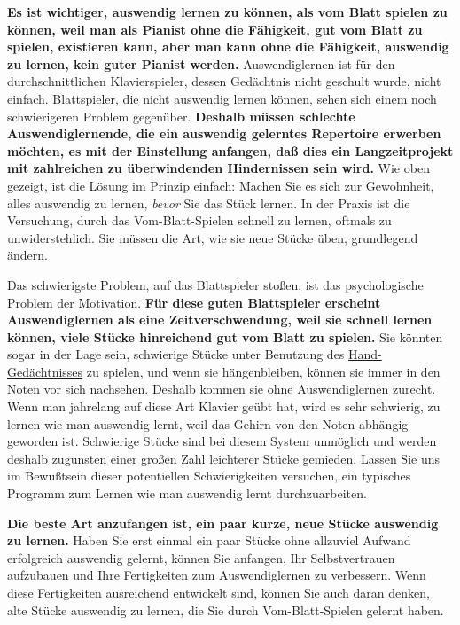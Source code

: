 \textbf{Es ist wichtiger, auswendig lernen zu können, als vom Blatt spielen zu können, weil man als Pianist ohne die Fähigkeit, gut vom Blatt zu spielen, existieren kann, aber man kann ohne die Fähigkeit, auswendig zu lernen, kein guter Pianist werden.}
Auswendiglernen ist für den durchschnittlichen Klavierspieler, dessen Gedächtnis nicht geschult wurde, nicht einfach.
Blattspieler, die nicht auswendig lernen können, sehen sich einem noch schwierigeren Problem gegenüber.
\textbf{Deshalb müssen schlechte Auswendiglernende, die ein auswendig gelerntes Repertoire erwerben möchten, es mit der Einstellung anfangen, daß dies ein Langzeitprojekt mit zahlreichen zu überwindenden Hindernissen sein wird.}
Wie oben gezeigt, ist die Lösung im Prinzip einfach: Machen Sie es sich zur Gewohnheit, alles auswendig zu lernen, \textit{bevor} Sie das Stück lernen.
In der Praxis ist die Versuchung, durch das Vom-Blatt-Spielen schnell zu lernen, oftmals zu unwiderstehlich.
Sie müssen die Art, wie sie neue Stücke üben, grundlegend ändern.

Das schwierigste Problem, auf das Blattspieler stoßen, ist das psychologische Problem der Motivation.
\textbf{Für diese guten Blattspieler erscheint Auswendiglernen als eine Zeitverschwendung, weil sie schnell lernen können, viele Stücke hinreichend gut vom Blatt zu spielen.}
Sie könnten sogar in der Lage sein, schwierige Stücke unter Benutzung des \hyperref[c1iii6d]{Hand-Gedächtnisses} zu spielen, und wenn sie hängenbleiben, können sie immer in den Noten vor sich nachsehen.
Deshalb kommen sie ohne Auswendiglernen zurecht.
Wenn man jahrelang auf diese Art Klavier geübt hat, wird es sehr schwierig, zu lernen wie man auswendig lernt, weil das Gehirn von den Noten abhängig geworden ist.
Schwierige Stücke sind bei diesem System unmöglich und werden deshalb zugunsten einer großen Zahl leichterer Stücke gemieden.
Lassen Sie uns im Bewußtsein dieser potentiellen Schwierigkeiten versuchen, ein typisches Programm zum Lernen wie man auswendig lernt durchzuarbeiten.

\textbf{Die beste Art anzufangen ist, ein paar kurze, neue Stücke auswendig zu lernen.}
Haben Sie erst einmal ein paar Stücke ohne allzuviel Aufwand erfolgreich auswendig gelernt, können Sie anfangen, Ihr Selbstvertrauen aufzubauen und Ihre Fertigkeiten zum Auswendiglernen zu verbessern.
Wenn diese Fertigkeiten ausreichend entwickelt sind, können Sie auch daran denken, alte Stücke auswendig zu lernen, die Sie durch Vom-Blatt-Spielen gelernt haben.

